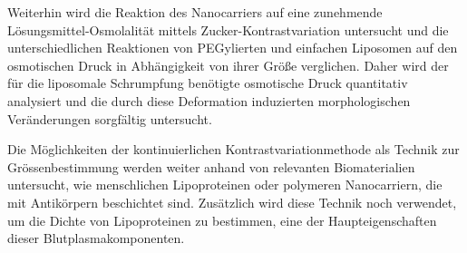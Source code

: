 

Weiterhin wird die Reaktion des Nanocarriers auf eine zunehmende Lösungsmittel-Osmolalität mittels Zucker-Kontrastvariation untersucht und die unterschiedlichen Reaktionen von PEGylierten und einfachen Liposomen auf den osmotischen Druck in Abhängigkeit von ihrer Größe verglichen. Daher wird der für die liposomale Schrumpfung benötigte osmotische Druck quantitativ analysiert und die durch diese Deformation induzierten morphologischen Veränderungen sorgfältig untersucht.




Die Möglichkeiten der kontinuierlichen Kontrastvariationmethode als Technik zur Grössenbestimmung werden weiter anhand von relevanten Biomaterialien untersucht, wie menschlichen Lipoproteinen oder polymeren Nanocarriern, die mit Antikörpern beschichtet sind. Zusätzlich wird diese Technik noch verwendet, um die Dichte von Lipoproteinen zu bestimmen, eine der Haupteigenschaften dieser Blutplasmakomponenten.








\normalsize

\cleardoublepage
